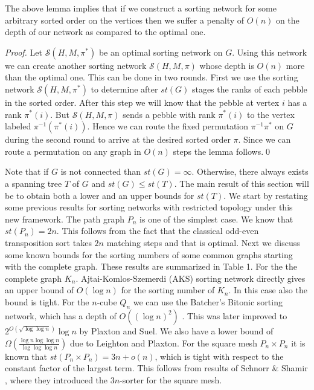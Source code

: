 \documentclass[runningheads,a4paper]{llncs}
\begin{document}
\noindent The above lemma implies that if we construct a sorting network for some arbitrary sorted order on the vertices then we suffer a penalty of $O(n)$ on the depth of our network as compared to the optimal one. 
\begin{proof}
	Let $\mathcal{S}(H, M, \pi^*)$ be an optimal sorting network on $G$. Using this network we can create another sorting network $\mathcal{S}(H, M, \pi)$ whose depth is $O(n)$ more than the optimal one. This can be done in two rounds. First we use the sorting network $\mathcal{S}(H, M, \pi^*)$ to determine after $st(G)$ stages the ranks of each pebble in the sorted order. After this step we will know that the pebble at vertex $i$ has a rank $\pi^*(i)$. But $\mathcal{S}(H, M, \pi)$ sends a pebble with rank $\pi^*(i)$ to the vertex labeled $\pi^{-1}(\pi^*(i))$. Hence we can route the fixed permutation $\pi^{-1}\pi^*$ on $G$ during the second round to arrive at the desired sorted order $\pi$. Since we can route a permutation on any graph in $O(n)$ steps the lemma follows.\qed

\end{proof}

\noindent Note that if $G$ is not connected than $st(G) = \infty$. Otherwise, there always exists a spanning tree $T$ of $G$ and $st(G) \le st(T)$. The main result of this section will be to obtain both a lower and an upper bounds for $st(T)$. We start by restating some previous results for sorting networks with restricted topology under this new framework. The path graph $P_n$ is one of the simplest case. We know that $st(P_n) = 2n$. This follows from the fact that the classical odd-even transposition sort takes $2n$ matching steps and that is optimal. Next we discuss some known bounds for the sorting numbers of some common graphs starting with the complete graph. These results are summarized in Table 1. For the the complete graph $K_n$. Ajtai-Komlos-Szemerdi (AKS) sorting network directly gives an upper bound of $O(\log {n})$ for the sorting number of $K_n$. In this case also the bound is tight. For the  $n$-cube $Q_n$ we can use the Batcher's Bitonic sorting network, which has a depth of $O((\log n)^2)$ \cite{2}. This was later improved to $2^{O(\sqrt{\log\log n})}\log n$ by Plaxton and Suel\cite{11}.  We also have a lower bound of $ \Omega(\frac{\log n \log\log n}{\log \log \log n})$ due to Leighton and Plaxton. For the square mesh $P_n \times P_n$ it is known that $st(P_n \times P_n)  = 3n + o(n)$, which is tight with respect to the constant factor of the largest term. This follows from results of Schnorr \& Shamir \cite{4}, where they introduced the $3n$-sorter for the square mesh.
\end{document}
